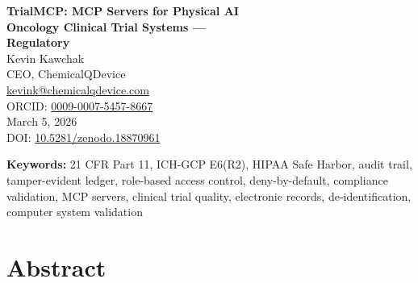 \documentclass[10pt,letterpaper]{article}
\begin{document}
\begin{center}
{\LARGE\bfseries\color{headerblue} TrialMCP: MCP Servers for Physical AI\\[4pt]
Oncology Clinical Trial Systems ---\\[4pt]
Regulatory}\\[16pt]

{\large Kevin Kawchak}\\[4pt]
{\normalsize CEO, ChemicalQDevice}\\[2pt]
{\small\href{mailto:kevink@chemicalqdevice.com}{kevink@chemicalqdevice.com}}\\[2pt]
{\small ORCID: \href{https://orcid.org/0009-0007-5457-8667}{0009-0007-5457-8667}}\\[12pt]

{\normalsize March 5, 2026}\\[8pt]

{\small DOI: \href{https://doi.org/10.5281/zenodo.18870961}{10.5281/zenodo.18870961}}\\[16pt]
\end{center}

\noindent\textbf{Keywords:} 21 CFR Part 11, ICH-GCP E6(R2), HIPAA Safe Harbor, audit trail, tamper-evident ledger, role-based access control, deny-by-default, compliance validation, MCP servers, clinical trial quality, electronic records, de-identification, computer system validation

\vspace{12pt}

\section*{Abstract}
\end{document}
